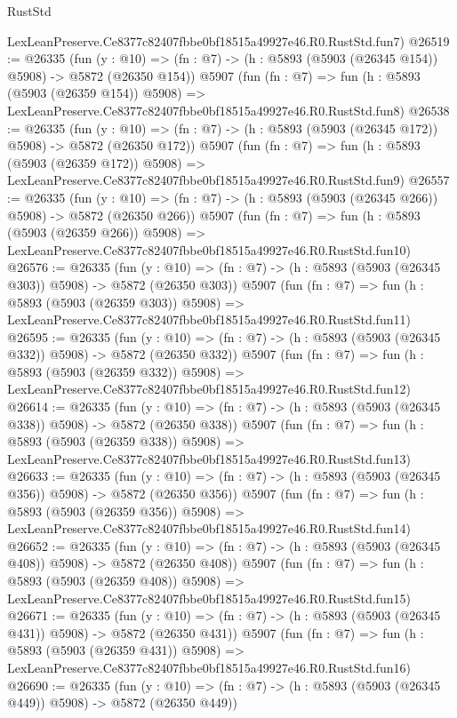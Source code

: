 \begin{lexlean}{RustStd}
\begin{coremodule}
    LexLeanPreserve.Ce8377c82407fbbe0bf18515a49927e46.R0.RustStd.fun7)
@26519 := @26335
    (fun (y : @10) => (fn : @7) -> (h : @5893 (@5903 (@26345 @154)) @5908) -> @5872 (@26350 @154))
    @5907
    (fun (fn : @7) =>
    fun (h : @5893 (@5903 (@26359 @154)) @5908) =>
    LexLeanPreserve.Ce8377c82407fbbe0bf18515a49927e46.R0.RustStd.fun8)
@26538 := @26335
    (fun (y : @10) => (fn : @7) -> (h : @5893 (@5903 (@26345 @172)) @5908) -> @5872 (@26350 @172))
    @5907
    (fun (fn : @7) =>
    fun (h : @5893 (@5903 (@26359 @172)) @5908) =>
    LexLeanPreserve.Ce8377c82407fbbe0bf18515a49927e46.R0.RustStd.fun9)
@26557 := @26335
    (fun (y : @10) => (fn : @7) -> (h : @5893 (@5903 (@26345 @266)) @5908) -> @5872 (@26350 @266))
    @5907
    (fun (fn : @7) =>
    fun (h : @5893 (@5903 (@26359 @266)) @5908) =>
    LexLeanPreserve.Ce8377c82407fbbe0bf18515a49927e46.R0.RustStd.fun10)
@26576 := @26335
    (fun (y : @10) => (fn : @7) -> (h : @5893 (@5903 (@26345 @303)) @5908) -> @5872 (@26350 @303))
    @5907
    (fun (fn : @7) =>
    fun (h : @5893 (@5903 (@26359 @303)) @5908) =>
    LexLeanPreserve.Ce8377c82407fbbe0bf18515a49927e46.R0.RustStd.fun11)
@26595 := @26335
    (fun (y : @10) => (fn : @7) -> (h : @5893 (@5903 (@26345 @332)) @5908) -> @5872 (@26350 @332))
    @5907
    (fun (fn : @7) =>
    fun (h : @5893 (@5903 (@26359 @332)) @5908) =>
    LexLeanPreserve.Ce8377c82407fbbe0bf18515a49927e46.R0.RustStd.fun12)
@26614 := @26335
    (fun (y : @10) => (fn : @7) -> (h : @5893 (@5903 (@26345 @338)) @5908) -> @5872 (@26350 @338))
    @5907
    (fun (fn : @7) =>
    fun (h : @5893 (@5903 (@26359 @338)) @5908) =>
    LexLeanPreserve.Ce8377c82407fbbe0bf18515a49927e46.R0.RustStd.fun13)
@26633 := @26335
    (fun (y : @10) => (fn : @7) -> (h : @5893 (@5903 (@26345 @356)) @5908) -> @5872 (@26350 @356))
    @5907
    (fun (fn : @7) =>
    fun (h : @5893 (@5903 (@26359 @356)) @5908) =>
    LexLeanPreserve.Ce8377c82407fbbe0bf18515a49927e46.R0.RustStd.fun14)
@26652 := @26335
    (fun (y : @10) => (fn : @7) -> (h : @5893 (@5903 (@26345 @408)) @5908) -> @5872 (@26350 @408))
    @5907
    (fun (fn : @7) =>
    fun (h : @5893 (@5903 (@26359 @408)) @5908) =>
    LexLeanPreserve.Ce8377c82407fbbe0bf18515a49927e46.R0.RustStd.fun15)
@26671 := @26335
    (fun (y : @10) => (fn : @7) -> (h : @5893 (@5903 (@26345 @431)) @5908) -> @5872 (@26350 @431))
    @5907
    (fun (fn : @7) =>
    fun (h : @5893 (@5903 (@26359 @431)) @5908) =>
    LexLeanPreserve.Ce8377c82407fbbe0bf18515a49927e46.R0.RustStd.fun16)
@26690 := @26335
    (fun (y : @10) => (fn : @7) -> (h : @5893 (@5903 (@26345 @449)) @5908) -> @5872 (@26350 @449))

\end{coremodule}
\end{lexlean}
